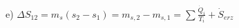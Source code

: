 e) \( \Delta S_{12} = m_{s} (s_2 - s_1) = m_{s,2} - m_{s,1} = \sum \frac{\dot{Q}_i}{T_i} + \dot{S}_{erz} \)